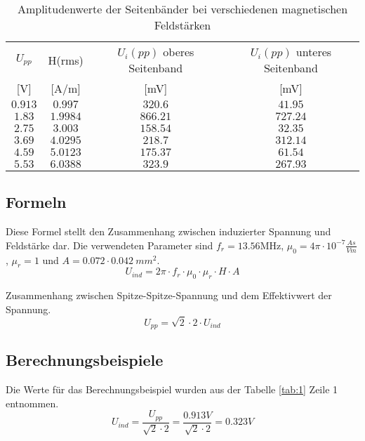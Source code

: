 \documentclass[12pt,a4paper,ngerman]{article}
\begin{document}
\begin{table}
\begin{center}
\begin{tabular}{ |c|c|c|c| }
  \hline
    $U_{pp}$ & H(rms) & $U_i(pp)$ oberes Seitenband & $U_i(pp)$ unteres Seitenband \\
	 {[V]} & {[A/m]} & {[mV]} & {[mV]} \\
  \hline
  $0.913$ & $0.997$ & $320.6$ & $41.95$\\
  \hline
  $1.83$ & $1.9984$ & $866.21$ & $727.24$ \\
  \hline
  $2.75$ & $3.003$ & $158.54$ & $32.35$\\
  \hline
  $3.69$ & $4.0295$ & $218.7$ & $312.14$\\
    \hline
  $4.59$ & $5.0123$ & $175.37$ & $61.54$\\
    \hline
  $5.53$ & $6.0388$ & $323.9$ & $267.93$ \\
    \hline 
\end{tabular}
\caption{Amplitudenwerte der Seitenbänder bei verschiedenen magnetischen Feldstärken}
\label{tab:ue4}
\end{center}
\end{table} 

\subsection{Formeln}
Diese Formel stellt den Zusammenhang zwischen induzierter Spannung und Feldstärke dar. Die verwendeten Parameter sind $f_r = 13.56$MHz, $\mu_0 = 4\pi \cdot 10^{-7}\frac{As}{Vm}$, $\mu_r = 1$ und $A = 0.072 \cdot 0.042\ mm^2$.
\begin{equation}
U_{ind} = 2\pi \cdot f_r \cdot \mu_0 \cdot \mu_r \cdot H \cdot A
\end{equation}

Zusammenhang zwischen Spitze-Spitze-Spannung und dem Effektivwert der Spannung.
\begin{equation}
U_{pp} = \sqrt{2}  \cdot 2 \cdot U_{ind}
\end{equation}

\subsection{Berechnungsbeispiele}
Die Werte für das Berechnungsbeispiel wurden aus der Tabelle \ref{tab:1} Zeile 1 entnommen.
\begin{equation}
U_{ind} = \frac{U_{pp}}{\sqrt{2}  \cdot 2} = \frac{0.913V}{\sqrt{2}  \cdot 2} = 0.323V
\end{equation}
\end{document}
